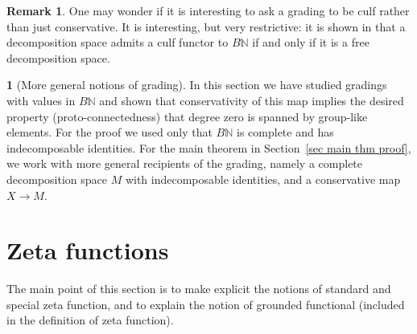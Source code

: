\documentclass{amsart}
\newcommand{\proto}{proto}
\newcommand{\N}{\mathbb{N}}
\theoremstyle{definition}
\newtheorem{remark}[theorem]{Remark}
\theoremstyle{noname}
\newtheorem{blanko}[theorem]{}
\begin{document}
\begin{remark}
  One may wonder if it is interesting to ask a grading to be culf rather than just 
  conservative. It is interesting, but very restrictive: it is shown in 
  \cite{Hackney-Kock:2210.11192} that a decomposition space admits a culf 
  functor to $B\N$ if and only if it is a free decomposition space.
\end{remark}


\begin{blanko}[More general notions of grading]
  In this section we have studied gradings with values in $B\N$ and shown that
  conservativity of this map implies the desired property (\proto-connectedness) that
  degree zero is spanned by group-like elements. For the proof we used only that $B\N$
  is complete and has indecomposable identities. For the main theorem in
  Section~\ref{sec main thm proof}, we work with more general recipients of the
  grading, namely a complete decomposition space $M$ with indecomposable identities,
  and a conservative map $X\to M$. 
\end{blanko}









\section{Zeta functions}
\label{sec:zeta}

The main point of this section is to make explicit the notions of standard and 
special zeta function, and to explain the notion of grounded functional (included 
in the definition of zeta function).
\end{document}
